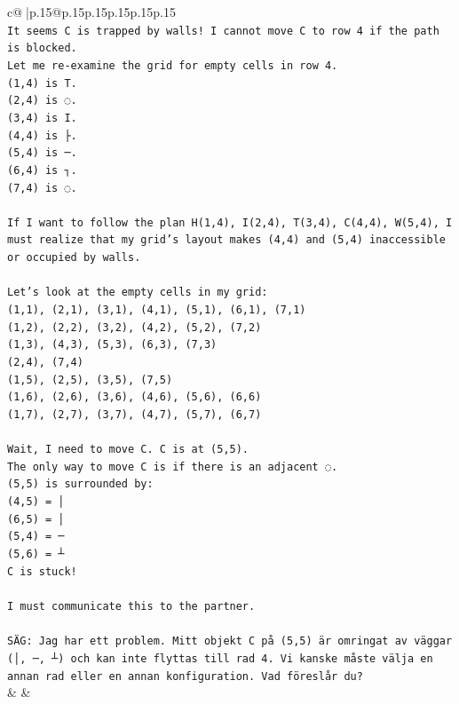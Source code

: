 \documentclass{article}
\begin{document}
{\begin{supertabular}{c@{$\;$}|p{.15\linewidth}@{}p{.15\linewidth}p{.15\linewidth}p{.15\linewidth}p{.15\linewidth}p{.15\linewidth}}
{{{\\ 
\texttt{It seems C is trapped by walls! I cannot move C to row 4 if the path is blocked.} \\
\texttt{Let me re{-}examine the grid for empty cells in row 4.} \\
\texttt{(1,4) is T.} \\
\texttt{(2,4) is ◌.} \\
\texttt{(3,4) is I.} \\
\texttt{(4,4) is ├.} \\
\texttt{(5,4) is ─.} \\
\texttt{(6,4) is ┐.} \\
\texttt{(7,4) is ◌.} \\
\\ 
\texttt{If I want to follow the plan H(1,4), I(2,4), T(3,4), C(4,4), W(5,4), I must realize that my grid's layout makes (4,4) and (5,4) inaccessible or occupied by walls.} \\
\\ 
\texttt{Let's look at the empty cells in my grid:} \\
\texttt{(1,1), (2,1), (3,1), (4,1), (5,1), (6,1), (7,1)} \\
\texttt{(1,2), (2,2), (3,2), (4,2), (5,2), (7,2)} \\
\texttt{(1,3), (4,3), (5,3), (6,3), (7,3)} \\
\texttt{(2,4), (7,4)} \\
\texttt{(1,5), (2,5), (3,5), (7,5)} \\
\texttt{(1,6), (2,6), (3,6), (4,6), (5,6), (6,6)} \\
\texttt{(1,7), (2,7), (3,7), (4,7), (5,7), (6,7)} \\
\\ 
\texttt{Wait, I need to move C. C is at (5,5).} \\
\texttt{The only way to move C is if there is an adjacent ◌.} \\
\texttt{(5,5) is surrounded by:} \\
\texttt{(4,5) = │} \\
\texttt{(6,5) = │} \\
\texttt{(5,4) = ─} \\
\texttt{(5,6) = ┴} \\
\texttt{C is stuck!} \\
\\ 
\texttt{I must communicate this to the partner.} \\
\\ 
\texttt{SÄG: Jag har ett problem. Mitt objekt C på (5,5) är omringat av väggar (│, ─, ┴) och kan inte flyttas till rad 4. Vi kanske måste välja en annan rad eller en annan konfiguration. Vad föreslår du?} \\
            }
        }
    }
    & & \\ \\


\end{supertabular}}
\end{document}
